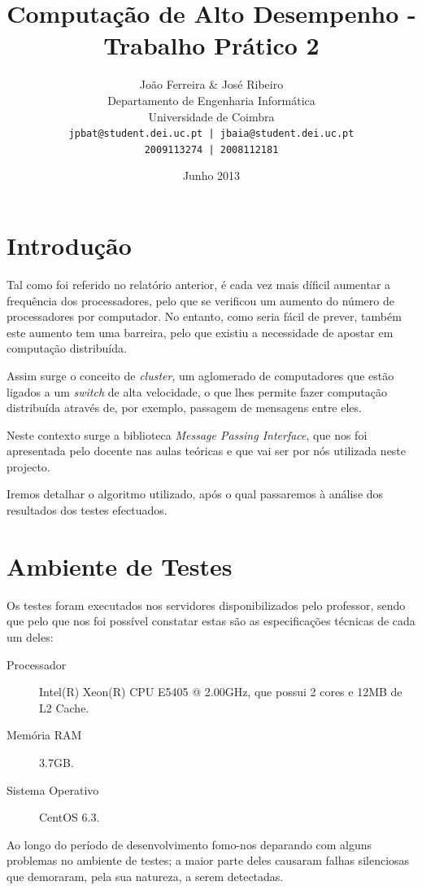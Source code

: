 \documentclass[a4paper]{article}
\title{Computação de Alto Desempenho - Trabalho Prático 2}
\author{João Ferreira \& José Ribeiro\\
		Departamento de Engenharia Informática\\
		Universidade de Coimbra\\
		\texttt{jpbat@student.dei.uc.pt | jbaia@student.dei.uc.pt}\\
		\texttt{2009113274 | 2008112181}}
\date{Junho 2013}
\begin{document}
\maketitle

\clearpage

\tableofcontents
\clearpage

\setlength{\parindent}{1cm}
\setlength{\parskip}{0.3cm}

\section{Introdução}
\indent \indent Tal como foi referido no relatório anterior, é cada vez mais díficil aumentar a frequência dos processadores, pelo que se verificou um aumento do número de processadores por computador. No entanto, como seria fácil de prever, também este aumento tem uma barreira, pelo que existiu a necessidade de apostar em computação distribuída.

Assim surge o conceito de \textit{cluster}, um aglomerado de computadores que estão ligados a um \textit{switch} de alta velocidade, o que lhes permite fazer computação distribuída através de, por exemplo, passagem de mensagens entre eles.

Neste contexto surge a biblioteca \textit{Message Passing Interface}, que nos foi apresentada pelo docente nas aulas teóricas e que vai ser por nós utilizada neste projecto.

Iremos detalhar o algoritmo utilizado, após o qual passaremos à análise dos resultados dos testes efectuados.
\clearpage

\section{Ambiente de Testes}
\indent \indent Os testes foram executados nos servidores disponibilizados pelo professor, sendo que pelo que nos foi possível constatar estas são as especificações técnicas de cada um deles:
\begin{description}
	\item [Processador] Intel(R) Xeon(R) CPU E5405 @ 2.00GHz, que possui 2 cores e 12MB de L2 Cache.
	\item [Memória RAM] 3.7GB.
	\item [Sistema Operativo] CentOS 6.3.
\end{description}

Ao longo do período de desenvolvimento fomo-nos deparando com alguns problemas no ambiente de testes; a maior parte deles causaram falhas silenciosas que demoraram, pela sua natureza, a serem detectadas.
\end{document}
